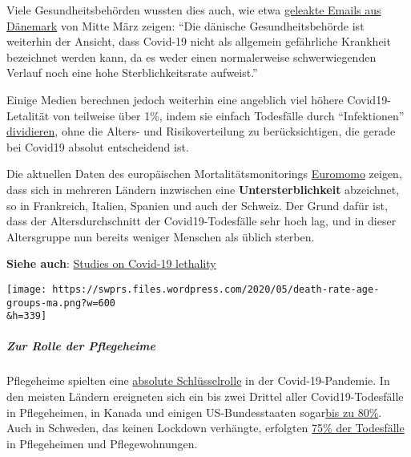 Viele Gesundheitsbehörden wussten dies auch, wie etwa
\href{https://www.thelocal.dk/20200529/leaked-emails-show-how-denmarks-pm-steam-rollered-her-own-health-agency}{geleakte
Emails aus Dänemark} von Mitte März zeigen: ``Die dänische
Gesundheitsbehörde ist weiterhin der Ansicht, dass Covid-19 nicht als
allgemein gefährliche Krankheit bezeichnet werden kann, da es weder
einen normalerweise schwerwiegenden Verlauf noch eine hohe
Sterblichkeitsrate aufweist.''

Einige Medien berechnen jedoch weiterhin eine angeblich viel höhere
Covid19-Letalität von teilweise über 1\%, indem sie einfach Todesfälle
durch ``Infektionen''
\href{https://english.elpais.com/society/2020-05-14/antibody-study-shows-just-5-of-spaniards-have-contracted-the-coronavirus.html}{dividieren},
ohne die Alters- und Risikoverteilung zu berücksichtigen, die gerade bei
Covid19 absolut entscheidend ist.

Die aktuellen Daten des europäischen Mortalitätsmonitorings
\href{https://www.euromomo.eu/graphs-and-maps/\#z-scores-by-country}{Euromomo}
zeigen, dass sich in mehreren Ländern inzwischen eine
\textbf{Untersterblichkeit} abzeichnet, so in Frankreich, Italien,
Spanien und auch der Schweiz. Der Grund dafür ist, dass der
Altersdurchschnitt der Covid19-Todesfälle sehr hoch lag, und in dieser
Altersgruppe nun bereits weniger Menschen als üblich sterben.

\textbf{Siehe auch}:
\href{https://swprs.org/studies-on-covid-19-lethality/}{Studies on
Covid-19 lethality}

\texttt{[image: https://swprs.files.wordpress.com/2020/05/death-rate-age-groups-ma.png?w=600\\\&h=339]}

\hypertarget{zur-rolle-der-pflegeheime}{%
\subparagraph{\texorpdfstring{\textbf{Zur Rolle der
Pflegeheime}}{Zur Rolle der Pflegeheime}}\label{zur-rolle-der-pflegeheime}}

Pflegeheime spielten eine
\href{https://ltccovid.org/2020/04/12/mortality-associated-with-covid-19-outbreaks-in-care-homes-early-international-evidence/}{absolute
Schlüsselrolle} in der Covid-19-Pandemie. In den meisten Ländern
ereigneten sich ein bis zwei Drittel aller Covid19-Todesfälle in
Pflegeheimen, in Kanada und einigen US-Bundesstaaten
sogar\href{https://freopp.org/the-covid-19-nursing-home-crisis-by-the-numbers-3a47433c3f70}{bis
zu 80\%}. Auch in Schweden, das keinen Lockdown verhängte, erfolgten
\href{https://www.thelocal.se/20200525/swedish-death-toll-passes-4000-as-coronavirus-cases-in-care-homes-start-to-fall}{75\%
der Todesfälle} in Pflegeheimen und Pflegewohnungen.

